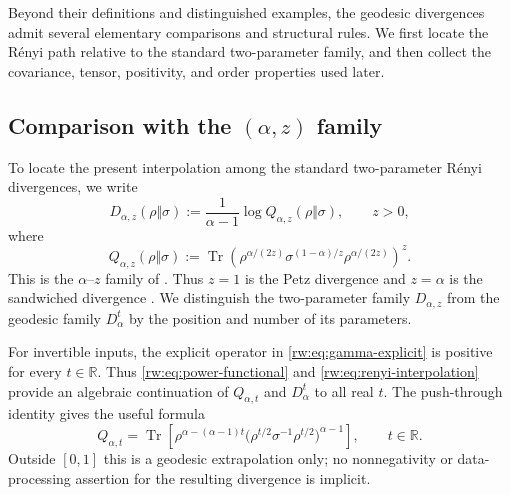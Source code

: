 \documentclass[11pt]{article}
\theoremstyle{remark}
\newcommand{\1}{\mathbbm{1}}
\begin{document}
Beyond their definitions and distinguished examples, the geodesic
divergences admit several elementary comparisons and structural rules.
We first locate the R\'enyi path relative to the standard
two-parameter family, and then collect the covariance, tensor,
positivity, and order properties used later.

\subsection{Comparison with the
\texorpdfstring{$(\alpha,z)$}{(alpha,z)} family}
\label{rw:subsec:alpha-z-comparison}

To locate the present interpolation among the standard two-parameter
R\'enyi divergences, we write
\begin{equation}
 D_{\alpha,z}(\rho\Vert\sigma)
 :=\frac{1}{\alpha-1}\log Q_{\alpha,z}(\rho\Vert\sigma),
 \qquad z>0,
 \label{rw:eq:alpha-z-divergence}
\end{equation}
where
\begin{equation}
 Q_{\alpha,z}(\rho\Vert\sigma)
 :=\operatorname{Tr}\!\left(
  \rho^{\alpha/(2z)}
  \sigma^{(1-\alpha)/z}
  \rho^{\alpha/(2z)}
 \right)^z .
 \label{rw:eq:alpha-z-functional}
\end{equation}
This is the $\alpha$--$z$ family of
\cite[Eqs.~(1)--(3)]{audenaert2015alphaz}.  Thus $z=1$ is the Petz
divergence and $z=\alpha$ is the sandwiched divergence
\cite[Eqs.~(5)--(6)]{audenaert2015alphaz}.  We distinguish
the two-parameter family $D_{\alpha,z}$ from the geodesic family
$D_\alpha^t$ by the position and number of its parameters.

For invertible inputs, the explicit operator in
\eqref{rw:eq:gamma-explicit} is positive for every $t\in\mathbb R$.
Thus \eqref{rw:eq:power-functional} and \eqref{rw:eq:renyi-interpolation} provide
an algebraic continuation of $Q_{\alpha,t}$ and $D_\alpha^t$ to all
real $t$.  The push-through identity gives the useful formula
\begin{equation}
 Q_{\alpha,t}
 =\operatorname{Tr}\!\left[
  \rho^{\alpha-(\alpha-1)t}
  \bigl(\rho^{t/2}\sigma^{-1}\rho^{t/2}\bigr)^{\alpha-1}
 \right],
 \qquad t\in\mathbb R.
 \label{rw:eq:power-functional-push-through}
\end{equation}
Outside $[0,1]$ this is a geodesic extrapolation only; no
nonnegativity or data-processing assertion for the resulting
divergence is implicit.
\end{document}
